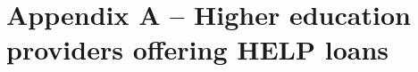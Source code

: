 \documentclass{grattan}
\begin{document}
\appendix
\chapter{Appendix A -- Higher education providers offering HELP loans}\label{chap:appendix-a-higher-education-providers-offering-help-loans}

\end{document}
